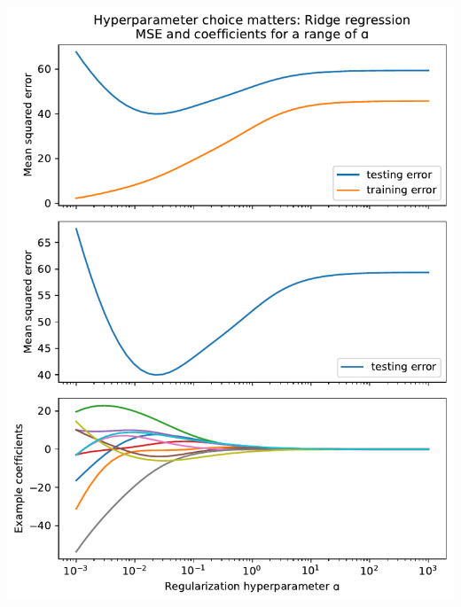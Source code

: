 \documentclass[presentation,mathserif,table]{beamer}
\begin{document}
\begin{frame}[label={sec:orgb3af1da}]{}
\includegraphics[height=\textheight]{hyperparameter_selection.pdf}
\end{frame}
\end{document}
